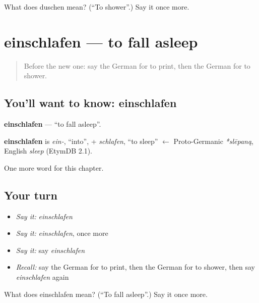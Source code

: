 \begin{tcolorbox}[breakable,colback=teal!4,colframe=teal!35!black,title={Before you move on}]
What does duschen mean? (\textquotedblleft{}To shower\textquotedblright{}.) Say it once more.
\end{tcolorbox}
\section[einschlafen]{einschlafen — to fall asleep}

\label{lesson:GE-C178-einschlafen}



\begin{quote}
Before the new one: say the German for to print, then the German for to shower.
\end{quote}

\subsection*{You'll want to know: einschlafen}
\textbf{einschlafen} — \textquotedblleft{}to fall asleep\textquotedblright{}.

\begin{cousinweb}
\textbf{einschlafen} is \emph{ein-}, \textquotedblleft{}into\textquotedblright{}, + \emph{schlafen}, \textquotedblleft{}to sleep\textquotedblright{} $\leftarrow$ Proto-Germanic \emph{*slēpaną}, English \emph{sleep} (EtymDB 2.1).
\end{cousinweb}

\begin{grammarlens}[title={What you've built}]
One more word for this chapter.
\end{grammarlens}

\subsection*{Your turn}
\begin{itemize}
\raggedright
  \item \emph{Say it:} \emph{einschlafen}
  \item \emph{Say it:} \emph{einschlafen}, once more
  \item \emph{Say it:} say \emph{einschlafen}
  \item \emph{Recall:} say the German for to print, then the German for to shower, then say \emph{einschlafen} again
\end{itemize}

\begin{tcolorbox}[breakable,colback=teal!4,colframe=teal!35!black,title={Before you move on}]
What does einschlafen mean? (\textquotedblleft{}To fall asleep\textquotedblright{}.) Say it once more.
\end{tcolorbox}
